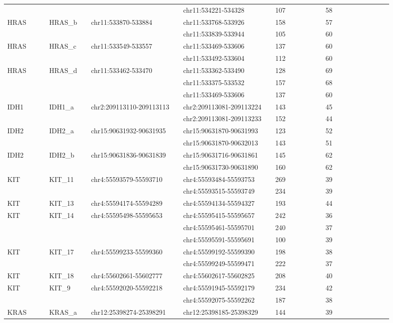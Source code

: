 \begin{landscape}
\begin{longtable}{p{0.1\linewidth}|p{0.1\linewidth}p{0.22\linewidth}p{0.22\linewidth}p{0.12\linewidth}p{0.16\linewidth}}
\\
 & & & chr11:534221-534328 & 107 & 58
\\
HRAS & HRAS\_b & chr11:533870-533884 & chr11:533768-533926 & 158 & 57
\\
 & & & chr11:533839-533944 & 105 & 60
\\
HRAS & HRAS\_c & chr11:533549-533557 & chr11:533469-533606 & 137 & 60
\\
 & & & chr11:533492-533604 & 112 & 60
\\
HRAS & HRAS\_d & chr11:533462-533470 & chr11:533362-533490 & 128 & 69
\\
 & & & chr11:533375-533532 & 157 & 68
\\
 & & & chr11:533469-533606 & 137 & 60
\\
\hline
IDH1 & IDH1\_a & chr2:209113110-209113113 & chr2:209113081-209113224 & 143 & 45
\\
 & & & chr2:209113081-209113233 & 152 & 44
\\
\hline
IDH2 & IDH2\_a & chr15:90631932-90631935 & chr15:90631870-90631993 & 123 & 52
\\
 & & & chr15:90631870-90632013 & 143 & 51
\\
IDH2 & IDH2\_b & chr15:90631836-90631839 & chr15:90631716-90631861 & 145 & 62
\\
 & & & chr15:90631730-90631890 & 160 & 62
\\
\hline
KIT & KIT\_11 & chr4:55593579-55593710 & chr4:55593484-55593753 & 269 & 39
\\
 & & & chr4:55593515-55593749 & 234 & 39
\\
KIT & KIT\_13 & chr4:55594174-55594289 & chr4:55594134-55594327 & 193 & 44
\\
KIT & KIT\_14 & chr4:55595498-55595653 & chr4:55595415-55595657 & 242 & 36
\\
 & & & chr4:55595461-55595701 & 240 & 37
\\
 & & & chr4:55595591-55595691 & 100 & 39
\\
KIT & KIT\_17 & chr4:55599233-55599360 & chr4:55599192-55599390 & 198 & 38
\\
 & & & chr4:55599249-55599471 & 222 & 37
\\
KIT & KIT\_18 & chr4:55602661-55602777 & chr4:55602617-55602825 & 208 & 40
\\
KIT & KIT\_9 & chr4:55592020-55592218 & chr4:55591945-55592179 & 234 & 42
\\
 & & & chr4:55592075-55592262 & 187 & 38
\\
\hline
KRAS & KRAS\_a & chr12:25398274-25398291 & chr12:25398185-25398329 & 144 & 39

\end{longtable}
\end{landscape}
